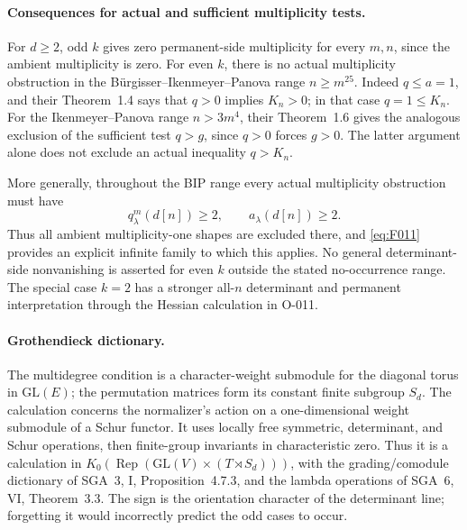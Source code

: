\paragraph{Consequences for actual and sufficient multiplicity tests.}
For \(d\geq2\), odd \(k\) gives zero permanent-side multiplicity
for every \(m,n\), since the ambient multiplicity is zero.
For even \(k\), there is no actual multiplicity obstruction in
the B\"urgisser--Ikenmeyer--Panova range \(n\geq m^{25}\).
Indeed \(q\leq a=1\), and their Theorem~1.4 says that
\(q>0\) implies \(K_n>0\); in that case \(q=1\leq K_n\).
For the Ikenmeyer--Panova range \(n>3m^4\), their Theorem~1.6
gives the analogous exclusion of the sufficient test \(q>g\),
since \(q>0\) forces \(g>0\). The latter argument alone does
not exclude an actual inequality \(q>K_n\).

More generally, throughout the BIP range every actual multiplicity
obstruction must have
\[
                     q^m_\lambda(d[n])\geq2,
                \qquad a_\lambda(d[n])\geq2.
\]
Thus all ambient multiplicity-one shapes are excluded there,
and \eqref{eq:F011} provides an explicit infinite family to which
this applies. No general determinant-side nonvanishing is asserted
for even \(k\) outside the stated no-occurrence range.
The special case \(k=2\) has a stronger all-\(n\) determinant
and permanent interpretation through the Hessian calculation in O-011.

\paragraph{Grothendieck dictionary.}
The multidegree condition is a character-weight submodule for the
diagonal torus in \(\mathrm{GL}(E)\); the permutation matrices
form its constant finite subgroup \(S_d\).
The calculation concerns the normalizer's action on a one-dimensional
weight submodule of a Schur functor. It uses locally free symmetric,
determinant, and Schur operations, then finite-group invariants in
characteristic zero. Thus it is a calculation in
\(K_0(\operatorname{Rep}(\mathrm{GL}(V)\times(T\rtimes S_d)))\),
with the grading/comodule dictionary of SGA~3, I, Proposition~4.7.3,
and the lambda operations of SGA~6, VI, Theorem~3.3.
The sign is the orientation character of the determinant line;
forgetting it would incorrectly predict the odd cases to occur.

